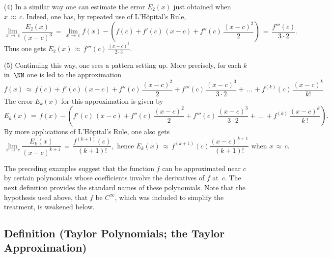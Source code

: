 {\V

        (4) In a similar way one can estimate the error $E_{2}(x)$ just obtained when $x \,{\approx}\, c$.
    Indeed, one has, by repeated use of L'H\^{o}pital's Rule,
        \begin{displaymath}
        \lim_{x \,{\rightarrow}\, c} \frac{E_{2}(x)}{(x-c)^{3}}
     \,=\, 
        \lim_{x \,{\rightarrow}\, c} f(x) - \left(f(c) + f'(c)\,(x-c) + {\displaystyle f''(c)\,\frac{(x-c)^{2}}{2}}\right)
     \,=\, 
        \frac{f'''(c)}{3{\cdot}2}.
        \end{displaymath}
    Thus one gets $E_{2}(x) \,{\approx}\, {\displaystyle f'''(c)\,\frac{(x-c)^{3}}{2{\cdot}3}}$.

\V

        (5) Continuing this way, one sees a pattern setting up. More precisely, for each $k$ in~${\NN}$ one is led to the approximation
        \begin{displaymath}
        f(x) \,{\approx}\, f(c) + f'(c)\,(x-c) + f''(c)\,\frac{(x-c)^{2}}{2} + f'''(c)\,\frac{(x-c)^{3}}{3{\cdot}2} + \,{\ldots}\, + f^{(k)}(c)\,\frac{(x-c)^{k}}{k!}
        \end{displaymath}
    The error $E_{k}(x)$ for this approximation is given by
        \begin{displaymath}
        E_{k}(x) \,=\, f(x) - \left(f'(c)\,(x-c) + f''(c)\,\frac{(x-c)^{2}}{2} + f'''(c)\,\frac{(x-c)^{3}}{3{\cdot}2} + \,{\ldots}\, + f^{(k)}\,\frac{(x-c)^{k}}{k\,!}\right).
        \end{displaymath}
    By more applications of L'H\^{o}pital's Rule, one also gets
        \begin{displaymath}
        \lim_{x \,{\rightarrow}\, c} \frac{E_{k}(x)}{(x-c)^{k+1}}
     \,=\, 
        \frac{f^{(k+1)}(c)}{(k+1)!}, \mbox{ hence } E_{k}(x) \,{\approx}\, f^{(k+1)}(c)\frac{(x-c)^{k+1}}{(k+1)!} \mbox{ when $x \,{\approx}\, c$}.
        \end{displaymath}

\VV

        The preceding examples suggest that the function $f$
    can be approximated near $c$ by certain polynomials whose coefficients involve the derivatives of $f$ at~$c$.
    The next definition provides the standard names of these polynomials. Note that the hypothesis used above,
    that $f$ be $C^{{\infty}}$, which was included to simplify the treatment, is weakened below.

\V

            \subsection{\small{\bf Definition} (Taylor Polynomials; the Taylor Approximation)}
            \label{DefE60.20}

}
